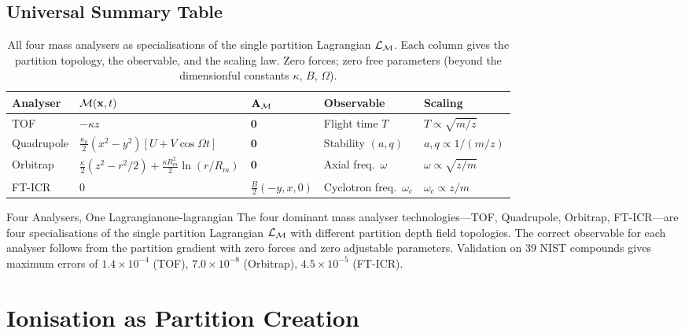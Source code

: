 \subsection{Universal Summary Table}

\begin{table}[htbp]
\centering
\caption{All four mass analysers as specialisations of the single partition
  Lagrangian $\mathcal{L}_{\mathcal{M}}$.  Each column gives the partition topology,
  the observable, and the scaling law.  Zero forces; zero free parameters
  (beyond the dimensionful constants $\kappa$, $B$, $\Omega$).}
\label{tab:ch21-analysers}
\begin{tabular}{@{}lllll@{}}
\toprule
\textbf{Analyser} & \textbf{$\mathcal{M}(\mathbf{x},t)$} & \textbf{$\mathbf{A}_{\mathcal{M}}$}
  & \textbf{Observable} & \textbf{Scaling} \\
\midrule
TOF       & $-\kappa z$ & $\mathbf{0}$
  & Flight time $T$ & $T\propto\sqrt{m/z}$ \\
Quadrupole & $\tfrac{\kappa_0}{2}(x^2-y^2)[U+V\cos\Omega t]$ & $\mathbf{0}$
  & Stability $(a,q)$ & $a,q\propto 1/(m/z)$ \\
Orbitrap  & $\tfrac{\kappa}{2}(z^2-r^2/2)+\tfrac{\kappa R_m^2}{2}\ln(r/R_m)$
  & $\mathbf{0}$ & Axial freq.\ $\omega$ & $\omega\propto\sqrt{z/m}$ \\
FT-ICR    & $0$ & $\tfrac{B}{2}(-y,x,0)$
  & Cyclotron freq.\ $\omega_c$ & $\omega_c\propto z/m$ \\
\bottomrule
\end{tabular}
\end{table}

\begin{consequence}{Four Analysers, One Lagrangian}{one-lagrangian}
  The four dominant mass analyser technologies---TOF, Quadrupole, Orbitrap,
  FT-ICR---are four specialisations of the single partition Lagrangian
  $\mathcal{L}_{\mathcal{M}}$ with different partition depth field topologies.  The
  correct observable for each analyser follows from the partition gradient
  with zero forces and zero adjustable parameters.  Validation on 39 NIST
  compounds gives maximum errors of $1.4\times 10^{-4}$ (TOF),
  $7.0\times 10^{-8}$ (Orbitrap), $4.5\times 10^{-5}$ (FT-ICR).
\end{consequence}

\section{Ionisation as Partition Creation}
\label{sec:ch21-ionisation}

